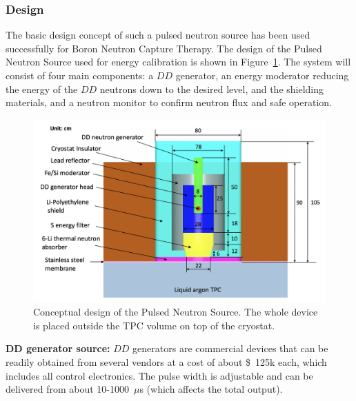 \subsubsection{Design}
\label{sec:sp-calib-sys-pns-des}

The basic design concept of such a pulsed neutron source has been used successfully for Boron Neutron Capture Therapy\cite{KOIVUNORO2004853}. The design of the Pulsed Neutron Source used for energy calibration is shown in Figure~\ref{fig:PNS_Moderator}. The system will consist of four main components: a $DD$ generator, an energy moderator reducing the energy of the $DD$ neutrons down to the desired level, and the shielding materials, and a neutron monitor to confirm neutron flux and safe operation. 

\begin{figure}[tpb]
\centering
\includegraphics[width=12cm]{graphics/PNS_Moderator.png}
\caption{Conceptual design of the Pulsed Neutron Source. The whole device is placed outside the TPC volume on top of the cryostat.}
\label{fig:PNS_Moderator}
\end{figure}

{\bf DD generator source:} $DD$ generators are commercial devices that can be readily obtained from several vendors at a cost of about \$~125k each, which includes all control electronics. The pulse width is adjustable and can be delivered from about 10-1000~$\mu$s (which affects the total output). 

